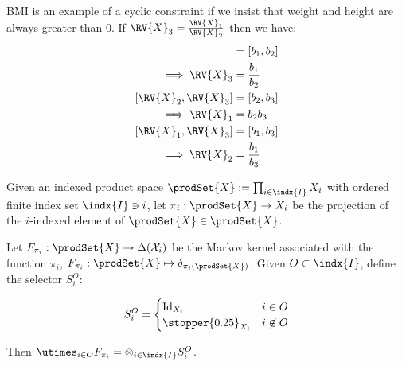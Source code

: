 BMI is an example of a cyclic constraint if we insist that weight and height are always greater than 0. If $\RV{X}_3 = \frac{\RV{X}_1}{\RV{X}_2}$ then we have:
\begin{align}
    [\RV{X}_1,\RV{X}_2] &= [b_1,b_2]\\
    \implies \RV{X}_3 &= \frac{b_1}{b_2}\\
    [\RV{X}_2,\RV{X}_3] &= [b_2,b_3]\\
    \implies \RV{X}_1 &= b_2 b_3\\
    [\RV{X}_1,\RV{X}_3] &= [b_1,b_3]\\
    \implies \RV{X}_2 &= \frac{b_1}{b_3}
\end{align}


\begin{lemma}\label{lem:proj_and_select}
Given an indexed product space $\prodSet{X}:=\prod_{i\in \indx{I}} X_i$ with ordered finite index set $\indx{I}\ni i$, let $\pi_i:\prodSet{X}\to X_i$ be the projection of the $i$-indexed element of $\prodSet{X}\in \prodSet{X}$.

Let $F_{\pi_i}:\prodSet{X}\to \Delta(\mathcal{X}_i)$ be the Markov kernel associated with the function $\pi_i$, $F_{\pi_i}:\prodSet{X}\mapsto\delta_{\pi_i(\prodSet{X})}$. Given $O\subset\indx{I}$, define the selector $S^O_i$:

\begin{align}
    S^O_i = \begin{cases}
        \mathrm{Id}_{X_i} & i\in O\\
        \stopper{0.25}_{X_i} & i\not\in O
    \end{cases}
\end{align}

Then $\utimes_{i\in O} F_{\pi_i}=\otimes_{i\in \indx{I}} S^O_i$.
\end{lemma}


